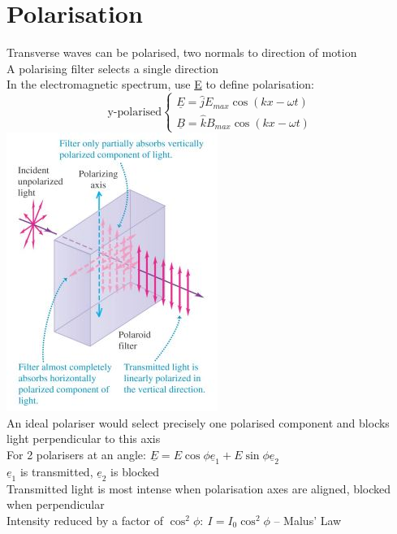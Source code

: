 \documentclass[a4paper, 11pt, fleqn, normalem]{report}
\begin{document}
\section{Polarisation}
Transverse waves can be polarised, two normals to direction of motion \\
A polarising filter selects a single direction \\
In the electromagnetic spectrum, use \underline{E} to define polarisation:
\begin{equation*}
    \text{y-polarised}
    \begin{cases}
        \underline{E} = \hat{j}E_{max}\cos{(kx - \omega t)} \\
        \underline{B} = \hat{k}B_{max}\cos{(kx - \omega t)}
    \end{cases}
\end{equation*}
\includegraphics[scale=0.8]{Polarisation.jpg} \\
An ideal polariser would select precisely one polarised component and blocks light perpendicular to this axis \\
For 2 polarisers at an angle: $\underline{E} = E\cos{\phi}\underline{e}_{1} + E\sin{\phi}\underline{e}_{2}$ \\
$\underline{e}_{1}$ is transmitted, $\underline{e}_{2}$ is blocked \\
Transmitted light is most intense when polarisation axes are aligned, blocked when perpendicular \\
Intensity reduced by a factor of $\cos^{2}{\phi}:~I = I_{0}\cos^{2}{\phi}$ -- Malus' Law
\end{document}
